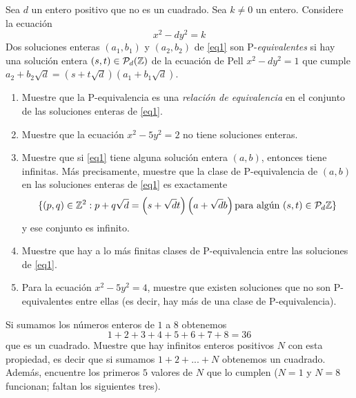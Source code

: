 \begin{prob}[2 pts. c/u]
	Sea $d$ un entero positivo que no es un cuadrado. Sea $k\neq0$ un entero. Considere la ecuación
	\begin{equation}
		x^2-dy^2=k\label{eq1}
	\end{equation}
	Dos soluciones enteras $(a_1,b_1)$ y $(a_2,b_2)$ de \eqref{eq1} son P-\textit{equivalentes} si hay una solución entera $(s,t)\in\mathcal{P}_d(\mathbb{Z})$ de la ecuación de Pell $x^2-dy^2=1$ que cumple $a_2+b_2\sqrt{d}=(s+t\sqrt{d})(a_1+b_1\sqrt{d})$.
	\begin{enumerate}[label = (\roman*)]
		\item Muestre que la P-equivalencia es una \textit{relación de equivalencia} en el conjunto de las soluciones enteras de \eqref{eq1}.

		\item Muestre que la ecuación $x^2-5y^2=2$ no tiene soluciones enteras.

		\item Muestre que si \eqref{eq1} tiene alguna solución entera $(a,b)$, entonces tiene infinitas. Más precisamente, muestre que la clase de P-equivalencia de $(a,b)$ en las soluciones enteras de \eqref{eq1} es exactamente
		      \[
			      \{(p,q)\in\mathbb{Z}^2: p+q\sqrt{d}=\left(s+\sqrt{d}t\right)\left(a+\sqrt{d}b\right)\text{para algún }(s,t)\in\mathcal{P}_d\mathbb{Z}\}
		      \]
		      y ese conjunto es infinito.

		\item Muestre que hay a lo más finitas clases de P-equivalencia entre las soluciones de \eqref{eq1}.

		\item Para la ecuación $x^2-5y^2=4$, muestre que existen soluciones que no son P-equivalentes entre ellas (es decir, hay más de una clase de P-equivalencia).
	\end{enumerate}
\end{prob}

\begin{sol}

\end{sol}

\begin{prob}[3 pts.]
	Si sumamos los números enteros de $1$ a $8$ obtenemos
	\[1+2+3+4+5+6+7+8=36\]
	que es un cuadrado. Muestre que hay infinitos enteros positivos $N$ con esta propiedad, es decir que si sumamos $1+2+...+N$ obtenemos un cuadrado. Además, encuentre los primeros $5$ valores de $N$ que lo cumplen ($N=1$ y $N=8$ funcionan; faltan los siguientes tres).
\end{prob}

